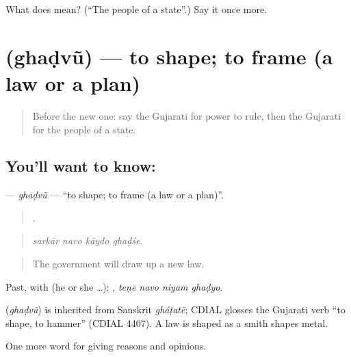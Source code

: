 \begin{tcolorbox}[breakable,colback=teal!4,colframe=teal!35!black,title={Before you move on}]
What does  mean? (\textquotedblleft{}The people of a state\textquotedblright{}.) Say it once more.
\end{tcolorbox}
\section[\texorpdfstring{\gu{ઘડવું} (ghaḍvũ)}{ઘડવું (ghaḍvũ)}]{ (ghaḍvũ) — to shape; to frame (a law or a plan)}

\label{lesson:GU-C352-ghadvu}



\begin{quote}
Before the new one: say the Gujarati for power to rule, then the Gujarati for the people of a state.
\end{quote}

\subsection*{You'll want to know: }
\textbf{} — \emph{ghaḍvũ} — \textquotedblleft{}to shape; to frame (a law or a plan)\textquotedblright{}.

\begin{quote}
   .
\end{quote}

\begin{quote}
\emph{sarkār navo kāydo ghaḍśe.}
\end{quote}

\begin{quote}
The government will draw up a new law.
\end{quote}

Past, with  (he or she …):    , \emph{teṇe navo niyam ghaḍyo}.

\begin{cousinweb}
\textbf{} (\emph{ghaḍvũ}) is inherited from Sanskrit \emph{gháṭatē}; CDIAL glosses the Gujarati verb \textquotedblleft{}to shape, to hammer\textquotedblright{} (CDIAL 4407). A law is shaped as a smith shapes metal.
\end{cousinweb}

\begin{grammarlens}[title={What you've built}]
One more word for giving reasons and opinions.
\end{grammarlens}

